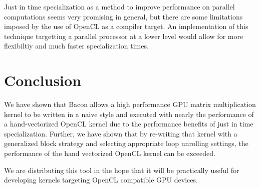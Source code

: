 \documentclass{llncs}
\begin{document}
Just in time specialization as a method to improve performance on
parallel computations seems very promising in general, but there are
some limitations imposed by the use of OpenCL as a compiler target. An
implementation of this technique targetting a parallel processor at a
lower level would allow for more flexibiltiy and much faster
specialization times.

\section{Conclusion}

We have shown that Bacon allows a high performance GPU matrix
multiplication kernel to be written in a naive style and executed with
nearly the performance of a hand-vectorized OpenCL kernel due to the
performance benefits of just in time specialization. Further, we have
shown that by re-writing that kernel with a generalized block strategy
and selecting appropriate loop unrolling settings, the performance of
the hand vectorized OpenCL kernel can be exceeded.

We are distributing this tool in the hope that it will be practically
useful for developing kernels targeting OpenCL compatible GPU devices.

{} 

\end{document}
